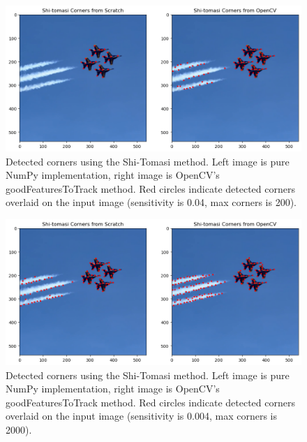 \documentclass[11pt, conference, letterpaper]{IEEEtran}
\begin{document}
\begin{figure}[h]
    \centering
    \includegraphics[width=0.95\linewidth]{images/shi_tomasi_corners.png}
    \caption{Detected corners using the Shi-Tomasi method. Left image is pure NumPy implementation, right image is OpenCV's goodFeaturesToTrack method. Red circles indicate detected corners overlaid on the input image (sensitivity is 0.04, max corners is 200).}
    \label{fig:shi_tomasi_results}
\end{figure}

\begin{figure}[h]
    \centering
    \includegraphics[width=0.95\linewidth]{images/shi_tomasi_corners_2.png}
    \caption{Detected corners using the Shi-Tomasi method. Left image is pure NumPy implementation, right image is OpenCV's goodFeaturesToTrack method. Red circles indicate detected corners overlaid on the input image (sensitivity is 0.004, max corners is 2000).}
    \label{fig:shi_tomasi_results2}
\end{figure}
\twocolumn
\end{document}

